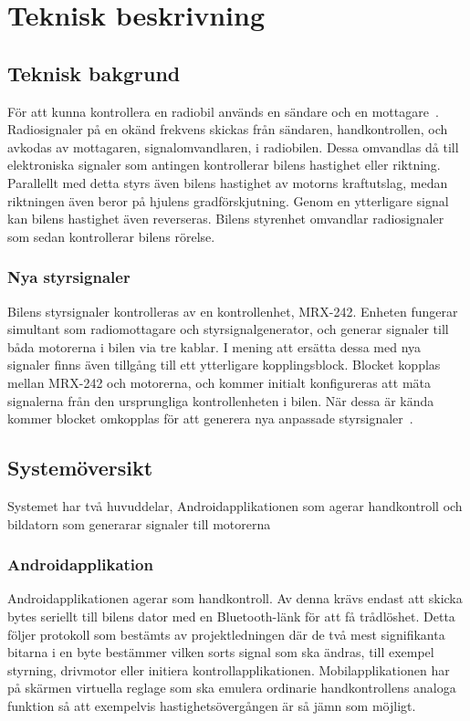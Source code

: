 \documentclass[a4paper]{article}
\begin{document}
\section{Teknisk beskrivning}

\subsection{Teknisk bakgrund}
För att kunna kontrollera en radiobil används en sändare och en mottagare~\cite{RCTechnique}. Radiosignaler på en okänd frekvens skickas från sändaren, handkontrollen, och avkodas av mottagaren, signalomvandlaren, i radiobilen. Dessa omvandlas då till elektroniska signaler som antingen kontrollerar bilens hastighet eller riktning. Parallellt med detta styrs även bilens hastighet av motorns kraftutslag, medan riktningen även beror på hjulens gradförskjutning. Genom en ytterligare signal kan bilens hastighet även reverseras. Bilens styrenhet omvandlar radiosignaler som sedan kontrollerar bilens rörelse.

\subsubsection{Nya styrsignaler}
Bilens styrsignaler kontrolleras av en kontrollenhet, MRX-242. Enheten fungerar simultant som radiomottagare och styrsignalgenerator, och generar signaler till båda motorerna i bilen via tre kablar. I mening att ersätta dessa med nya signaler finns även tillgång till ett ytterligare kopplingsblock. Blocket kopplas mellan MRX-242 och motorerna, och kommer initialt konfigureras att mäta signalerna från den ursprungliga kontrollenheten i bilen. När dessa är kända kommer blocket omkopplas för att generera nya anpassade styrsignaler~\cite{projektDir}. 


\subsection{Systemöversikt}
Systemet har två huvuddelar, Androidapplikationen som agerar handkontroll och bildatorn som generarar signaler till motorerna

\subsubsection{Androidapplikation}
Androidapplikationen agerar som handkontroll. Av denna krävs endast att skicka bytes seriellt till bilens dator med en Bluetooth-länk för att få trådlöshet. Detta följer protokoll som bestämts av projektledningen där de två mest signifikanta bitarna i en byte bestämmer vilken sorts signal som ska ändras, till exempel styrning, drivmotor eller initiera kontrollapplikationen. Mobilapplikationen har på skärmen virtuella reglage som ska emulera ordinarie handkontrollens analoga funktion så att exempelvis hastighetsövergången är så jämn som möjligt.
\end{document}

